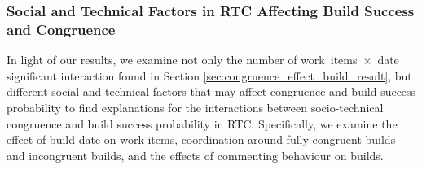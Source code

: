 



\subsubsection{Social and Technical Factors in RTC Affecting Build Success and Congruence}
\label{sec:otherfactors}
In light of our results, we examine not only the number of work~items~$\times$~date significant interaction found in Section \ref{sec:congruence_effect_build_result}, but different social and technical factors that may affect congruence
and build success probability to find explanations for the interactions between socio-technical congruence and build success probability in RTC.
Specifically, we examine the effect of build date on work items, coordination around fully-congruent builds and
incongruent builds, and the effects of commenting behaviour on builds.

